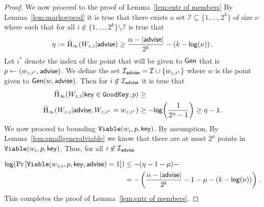 \begin{proof}
\noindent
We now proceed to the proof of Lemma~\ref{lem:entr of members}
By Lemma~\ref{lem:markovpred} it is true that there exists a set $\mathcal{I}\subseteq \{1,...,2^k\}$ of size $\nu$ where  such that for all $i\not \in \{1,...,2^k\} \setminus\mathcal{I}$ is true that 
\[
\eta:=\tilde{\mathrm{H}}_\infty(W_{z,i} | {\mathsf{advise}}) \ge \frac{\alpha -|{\mathsf{advise}}|}{2^k} -\left(k-\mathsf{log}\!\left(\nu\right)\right).
\]
Let $i^*$ denote the index of the point that will be given to ${\mathsf{Gen}}$ that is $p\leftarrow (w_{z,i^*}, {\mathsf{advise}})$.  We define the set $\mathcal{I}_{\mathsf{advise}} = \mathcal{I} \cup \{w_{z,i^*}\}$ where $w$ is the point given to ${\mathsf{Gen}}(w, {\mathsf{advise}})$.  
Then for $i\not\in \mathcal{I}_{{\mathsf{advise}}}$ it is true that 
\begin{align*}
\tilde{\mathrm{H}}_\infty(W_{z,i} | \mathsf{key} \in \mathtt{GoodKey}, p)&\ge \\
\tilde{\mathrm{H}}_\infty(W_{z,i} | {\mathsf{advise}}, W_{z,i^*}= w_{z,i^*}) &\ge -\mathsf{log}\!\left(\frac{1}{2^{\eta}-1}\right) \ge \eta-1.
\end{align*}
We now proceed to bounding $\mathtt{Viable}(w_i, p, \mathsf{key})$.  By assumption, By Lemma~\ref{lem:smallgeneralviable} we know that there are at most $2^\mu$ points in $\mathtt{Viable}(w_i, p, \mathsf{key})$.  Thus, for all $i\not \in\mathcal{I}_{{\mathsf{advise}}}$ 

\begin{align*}
\mathsf{log}\!\left(\Pr\left[\mathtt{Viable}(w_{z,i}, p, \mathsf{key}, {\mathsf{advise}}) = 1 \right]\right)&\le - (\eta-1 -\mu) - \\
&=-\left(\frac{\alpha -|{\mathsf{advise}}| }{2^k}-1-\mu-\left(k-\mathsf{log}\!\left(\nu\right)\right)\right).
\end{align*}
This completes the proof of Lemma~\ref{lem:entr of members}.
\end{proof}


